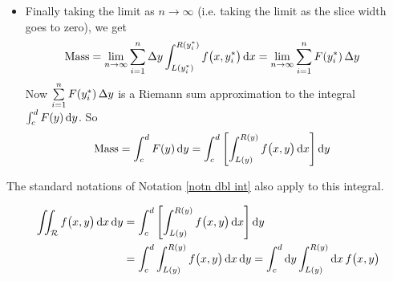 \begin{itemize}
\begin{itemize}
\item 
On rectangle number $j$ in slice number $i$, we approximate the density
by $f\big(x_j^*,y_i^*\big)$, giving us that
the mass of rectangle number $j$ in slice number $i$ is approximately $f\big(x_j^*,y_i^*\big)\,\De x\,\De y$.
\item 
So the Riemann sum approximation of the mass of (horizontal) slice number 
$i$ is
\begin{align*}
  \text{Mass of slice $i$} 
          &\approx \sum_{j=1}^m  f\big(x_j^*,y_i^*\big)\,\De x\,\De y
\end{align*}
\item 
By taking the limit as $m \to \infty$ (i.e. taking the limit as the width 
of the rectangles goes to zero), we convert the Riemann sum into a definite integral:
\begin{align*}
  \text{Mass of slice $i$} 
          &\approx \De y \int_{L(y_i^*)}^{R(y_i^*)} f\big(x,y_i^*\big)\,\dee{x}
          = F(y_i^*)\,\De y
\end{align*}
where
\begin{equation*}
F(y) = \int_{L(y)}^{R(y)} f\big(x,y\big)\,\dee{x}
\end{equation*}
Observe that, as $x$ has been integrated out, $F(y)$ is a function of $y$ 
only, not of $x$ and $y$.
\end{itemize}
\item
Finally taking the limit as $n \to \infty$ (i.e. taking the limit as the slice 
width goes to zero), we get
\begin{align*}
\text{Mass}
&=\lim_{n\rightarrow\infty}\sum_{i=1}^n  
\Delta y \int_{L(y_i^*)}^{R(y_i^*)} f\big(x,y_i^*\big)\,\mathrm{d}x
= \lim_{n\rightarrow\infty}\sum_{i=1}^n  F(y_i^*)\,\Delta y  
\end{align*}
Now $\sum\limits_{i=1}^n  F(y_i^*)\,\Delta y$ is a Riemann sum approximation
to the integral $ \int_c^d F(y)\,\mathrm{d}y$. So
\begin{align*}
\text{Mass}
&= \int_c^d F(y)\,\mathrm{d}y
=\int_c^d \left[\int_{L(y)}^{R(y)} f\big(x,y\big)\,\mathrm{d}x\right]\mathrm{d}y 
\end{align*}
\end{itemize}
The standard notations of Notation \ref{notn dbl int} also
apply to this integral.
\begin{notn}\label{notn dbl int again}
\begin{align*}
\iint_{\mathcal{R}} f\big(x,y\big)\,\mathrm{d}x\,\mathrm{d}y
&=\int_c^d \left[\int_{L(y)}^{R(y)} f\big(x,y\big)\,\mathrm{d}x\right]\mathrm{d}y \\
&=\int_c^d \int_{L(y)}^{R(y)} f\big(x,y\big)\,\mathrm{d}x\,\mathrm{d}y
=\int_c^d \mathrm{d}y \int_{L(y)}^{R(y)} \mathrm{d}x\, f\big(x,y\big)
\end{align*}
\end{notn}
